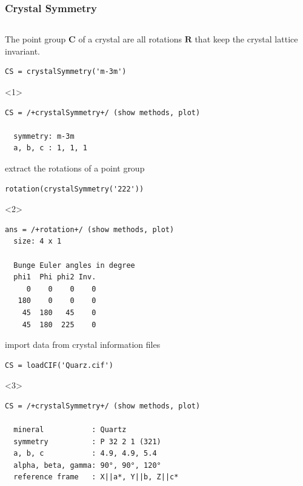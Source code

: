 \documentclass[compress]{beamer}
\begin{document}
\begin{frame}
  \frametitle{Crystal Symmetry}

  \begin{columns}
  \begin{column}{8cm}

    \begin{overlayarea}{8cm}{8cm}
      The \alert{point group} $\mathbf C$ of a crystal are all rotations
      $\mathbf R$ that keep the crystal lattice invariant.

\begin{lstlisting}[style=input]
CS = crystalSymmetry('m-3m')
\end{lstlisting}
    \begin{onlyenv}<1>
\vspace{-.3cm}\begin{lstlisting}[style=output]
CS = /+crystalSymmetry+/ (show methods, plot)

  symmetry: m-3m
  a, b, c : 1, 1, 1
\end{lstlisting}
    \end{onlyenv}

    \pause \medskip

    extract the rotations of a point group
\begin{lstlisting}[style=input]
 rotation(crystalSymmetry('222'))
\end{lstlisting}
    \begin{onlyenv}<2>
\vspace{-.3cm}\begin{lstlisting}[style=output]
ans = /+rotation+/ (show methods, plot)
  size: 4 x 1

  Bunge Euler angles in degree
  phi1  Phi phi2 Inv.
     0    0    0    0
   180    0    0    0
    45  180   45    0
    45  180  225    0
\end{lstlisting}
    \end{onlyenv}

    \pause \medskip

    import data from crystal information files
\begin{lstlisting}[style=input]
CS = loadCIF('Quarz.cif')
\end{lstlisting}
    \begin{onlyenv}<3>
\vspace{-.3cm}\begin{lstlisting}[style=output]
CS = /+crystalSymmetry+/ (show methods, plot)

  mineral           : Quartz
  symmetry          : P 32 2 1 (321)
  a, b, c           : 4.9, 4.9, 5.4
  alpha, beta, gamma: 90°, 90°, 120°
  reference frame   : X||a*, Y||b, Z||c*
\end{lstlisting}
\end{onlyenv}


\end{overlayarea}
\end{column}
\end{columns}
\end{frame}
\end{document}
